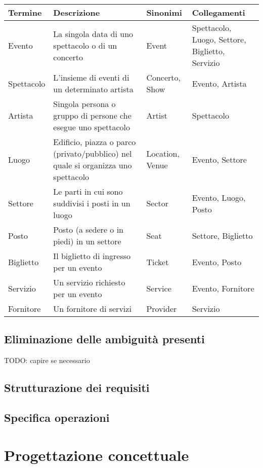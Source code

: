 \documentclass[a4paper,11pt]{article}
\begin{document}
\begin{tabularx}{\textwidth}{|X|>{\raggedright\arraybackslash}X|X|>{\raggedright\arraybackslash}X|}
\hline
\textbf{Termine} & \textbf{Descrizione} & \textbf{Sinonimi} & \textbf{Collegamenti}\\
\hline
Evento & La singola data di uno spettacolo o di un concerto & Event & Spettacolo, Luogo, Settore, Biglietto, Servizio\\
\hline
Spettacolo & L'insieme di eventi di un determinato artista & Concerto, Show & Evento, Artista\\
\hline
Artista & Singola persona o gruppo di persone che esegue uno spettacolo & Artist & Spettacolo\\
\hline
Luogo & Edificio, piazza o parco (privato/pubblico) nel quale si organizza uno spettacolo & Location, Venue & Evento, Settore\\
\hline
Settore & Le parti in cui sono suddivisi i posti in un luogo & Sector & Evento, Luogo, Posto\\
\hline
Posto & Posto (a sedere o in piedi) in un settore & Seat & Settore, Biglietto\\
\hline
Biglietto & Il biglietto di ingresso per un evento & Ticket & Evento, Posto\\
\hline
Servizio & Un servizio richiesto per un evento & Service & Evento, Fornitore\\
\hline
Fornitore & Un fornitore di servizi & Provider & Servizio\\
\hline
\end{tabularx}

\subsection{Eliminazione delle ambiguità presenti}
TODO: capire se necessario


\subsection{Strutturazione dei requisiti}

\subsection{Specifica operazioni}

\section{Progettazione concettuale}
\end{document}
